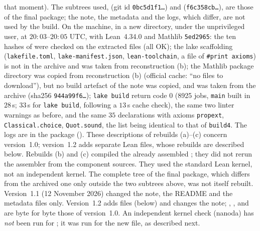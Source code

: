 \documentclass[11pt,a4paper]{article}
\theoremstyle{plain}
\theoremstyle{definition}
\theoremstyle{remark}
\numberwithin{equation}{section}
\begin{document}
that moment). The subtrees used,  (git id \texttt{0bc5d1f1\dots}) and  (\texttt{f6c358cb\dots}), are those of the final package; the
note, the metadata and the logs, which differ, are not used by the build. On the machine, in a new directory, under the unprivileged user, at
$20{:}03$--$20{:}05$ UTC, with Lean~4.34.0 and Mathlib \texttt{5ed2965}: the ten hashes of  were checked on the extracted files (all OK);
the lake scaffolding (\texttt{lakefile.toml}, \texttt{lake-manifest.json}, \texttt{lean-toolchain}, a file of \texttt{\#print axioms}) is not in the archive and was taken from
reconstruction (b); the Mathlib package directory was copied from reconstruction (b) (official cache: ``no files to download''), but no build artefact of the note was
copied, and  was taken from the archive (sha256 \texttt{944a99f6\dots}); \texttt{lake build} return code $0$ (8925 jobs, \texttt{main} built in $28$\,s; $33$\,s for \texttt{lake build}, following a $13$\,s cache check), the
same two linter warnings as before, and the same $35$ declarations with axioms \texttt{propext}, \texttt{Classical.choice}, \texttt{Quot.sound}, the list being identical to that of \texttt{build4}. The logs are
in the package (). These descriptions of rebuilds (a)--(c) concern version~1.0; version~1.2 adds separate Lean files, whose rebuilds are described below. Rebuilds (b) and (c) compiled the already assembled ; they did not rerun the assembler from the component sources. They used the standard Lean kernel, not an independent kernel. The complete tree of the final package, which differs from the archived one only outside the two subtrees above, was not itself rebuilt. Version~1.1 (12 November 2026) changed the note, the README and the metadata files only. Version~1.2 adds files (below) and changes the note; , ,  and  are byte for byte those of version~1.0. An independent kernel check (nanoda) has \emph{not} been run for ; it was run for the new file, as described next.
\end{document}
